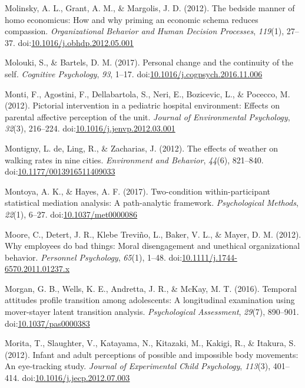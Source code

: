 \documentclass[english,man]{apa6}
\begin{document}
\hypertarget{ref-Molinsky2012}{}
Molinsky, A. L., Grant, A. M., \& Margolis, J. D. (2012). The bedside
manner of homo economicus: How and why priming an economic schema
reduces compassion. \emph{Organizational Behavior and Human Decision
Processes}, \emph{119}(1), 27--37.
doi:\href{https://doi.org/10.1016/j.obhdp.2012.05.001}{10.1016/j.obhdp.2012.05.001}

\hypertarget{ref-Molouki2017}{}
Molouki, S., \& Bartels, D. M. (2017). Personal change and the
continuity of the self. \emph{Cognitive Psychology}, \emph{93}, 1--17.
doi:\href{https://doi.org/10.1016/j.cogpsych.2016.11.006}{10.1016/j.cogpsych.2016.11.006}

\hypertarget{ref-Monti2012}{}
Monti, F., Agostini, F., Dellabartola, S., Neri, E., Bozicevic, L., \&
Pocecco, M. (2012). Pictorial intervention in a pediatric hospital
environment: Effects on parental affective perception of the unit.
\emph{Journal of Environmental Psychology}, \emph{32}(3), 216--224.
doi:\href{https://doi.org/10.1016/j.jenvp.2012.03.001}{10.1016/j.jenvp.2012.03.001}

\hypertarget{ref-DeMontigny2012}{}
Montigny, L. de, Ling, R., \& Zacharias, J. (2012). The effects of
weather on walking rates in nine cities. \emph{Environment and
Behavior}, \emph{44}(6), 821--840.
doi:\href{https://doi.org/10.1177/0013916511409033}{10.1177/0013916511409033}

\hypertarget{ref-Montoya2017}{}
Montoya, A. K., \& Hayes, A. F. (2017). Two-condition within-participant
statistical mediation analysis: A path-analytic framework.
\emph{Psychological Methods}, \emph{22}(1), 6--27.
doi:\href{https://doi.org/10.1037/met0000086}{10.1037/met0000086}

\hypertarget{ref-Moore2012}{}
Moore, C., Detert, J. R., Klebe Treviño, L., Baker, V. L., \& Mayer, D.
M. (2012). Why employees do bad things: Moral disengagement and
unethical organizational behavior. \emph{Personnel Psychology},
\emph{65}(1), 1--48.
doi:\href{https://doi.org/10.1111/j.1744-6570.2011.01237.x}{10.1111/j.1744-6570.2011.01237.x}

\hypertarget{ref-Morgan2016}{}
Morgan, G. B., Wells, K. E., Andretta, J. R., \& McKay, M. T. (2016).
Temporal attitudes profile transition among adolescents: A longitudinal
examination using mover-stayer latent transition analysis.
\emph{Psychological Assessment}, \emph{29}(7), 890--901.
doi:\href{https://doi.org/10.1037/pas0000383}{10.1037/pas0000383}

\hypertarget{ref-Morita2012}{}
Morita, T., Slaughter, V., Katayama, N., Kitazaki, M., Kakigi, R., \&
Itakura, S. (2012). Infant and adult perceptions of possible and
impossible body movements: An eye-tracking study. \emph{Journal of
Experimental Child Psychology}, \emph{113}(3), 401--414.
doi:\href{https://doi.org/10.1016/j.jecp.2012.07.003}{10.1016/j.jecp.2012.07.003}
\end{document}
